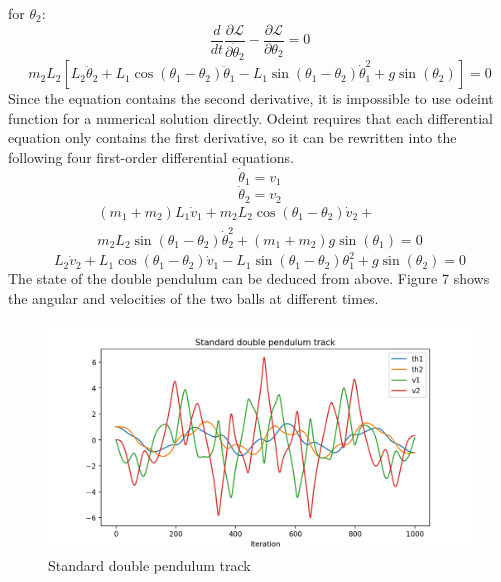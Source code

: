 \documentclass[11pt,a4paper]{article}
\begin{document}
for $\theta_{2}$:
\begin{equation}
\frac{d}{d t} \frac{\partial \mathcal{L}}{\partial \dot{\theta}_{2}}-\frac{\partial \mathcal{L}}{\partial \theta_{2}}=0
\end{equation}
\begin{equation}
m_{2} L_{2}\left[L_{2} \ddot{\theta}_{2}+L_{1} \cos \left(\theta_{1}-\theta_{2}\right) \ddot{\theta}_{1}-L_{1} \sin \left(\theta_{1}-\theta_{2}\right) \dot{\theta}_{1}^{2}+g \sin \left(\theta_{2}\right)\right]=0
\end{equation}
Since the equation contains the second derivative, it is impossible to use odeint function for a numerical solution directly. Odeint requires that each differential equation only contains the first derivative, so it can be rewritten into the following four first-order differential equations.
\begin{equation}
\dot{\theta}_{1}=v_{1}
\end{equation}
\begin{equation}
\dot{\theta}_{2}=v_{2}
\end{equation}
\begin{equation}
\begin{aligned}\left(m_{1}+m_{2}\right) L_{1} \dot{v}_{1}+m_{2} L_{2} \cos \left(\theta_{1}-\theta_{2}\right) \dot{v}_{2}+\\
m_{2} L_{2} \sin \left(\theta_{1}-\theta_{2}\right) \dot{\theta}_{2}^{2}+\left(m_{1}+m_{2}\right) g \sin \left(\theta_{1}\right)=0 \end{aligned}
\end{equation}
\begin{equation}
L_{2} \dot{v}_{2}+L_{1} \cos \left(\theta_{1}-\theta_{2}\right) \dot{v}_{1}-L_{1} \sin \left(\theta_{1}-\theta_{2}\right) \theta_{1}^{2}+g \sin \left(\theta_{2}\right)=0
\end{equation}
The state of the double pendulum can be deduced from above. Figure 7 shows the angular and velocities of the two balls at different times.
\begin{figure}[ht!]
\centering
\includegraphics[scale=0.5]{7.png}
\caption{Standard double pendulum track}
\label{fig:Standard double pendulum track}
\end{figure}
\end{document}
